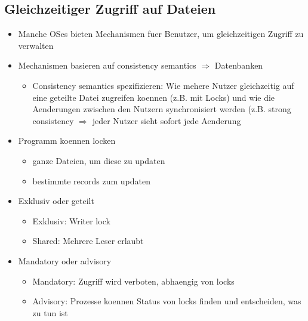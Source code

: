\documentclass[a4paper]{scrreprt}
\begin{document}
\subsection{Gleichzeitiger Zugriff auf Dateien}
\begin{itemize}
	\item Manche OSes bieten Mechanismen fuer Benutzer, um gleichzeitigen Zugriff zu verwalten
	\item Mechanismen basieren auf consistency semantics $\Rightarrow$ Datenbanken
		\begin{itemize}
			\item Consistency semantics spezifizieren: Wie mehere Nutzer gleichzeitig auf eine geteilte Datei zugreifen koennen (z.B. mit Locks) und wie die Aenderungen zwischen den Nutzern synchronisiert werden (z.B. strong consistency $\Rightarrow$ jeder Nutzer sieht sofort jede Aenderung
		\end{itemize}
	\item Programm koennen locken
		\begin{itemize}
			\item ganze Dateien, um diese zu updaten
			\item bestimmte records zum updaten
		\end{itemize}
	\item Exklusiv oder geteilt
		\begin{itemize}
			\item Exklusiv: Writer lock
			\item Shared: Mehrere Leser erlaubt
		\end{itemize}
	\item Mandatory oder advisory
		\begin{itemize}
			\item Mandatory: Zugriff wird verboten, abhaengig von locks
			\item Advisory: Prozesse koennen Status von locks finden und entscheiden, was zu tun ist
		\end{itemize}
\end{itemize}
\end{document}
